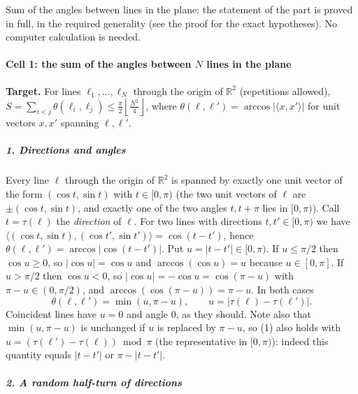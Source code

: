 
Sum of the angles between lines in the plane: the statement of the part
is proved in full, in the required generality (see the proof for the
exact hypotheses). No computer calculation is needed.


\paragraph{\texorpdfstring{Cell 1: the sum of the angles between \(N\)
lines in the
plane}{Cell 1: the sum of the angles between N lines in the plane}}\label{cell-1-the-sum-of-the-angles-between-n-lines-in-the-plane}

\textbf{Target.} For lines \(\ell_1,\dots,\ell_N\) through the origin of
\(\mathbb R^2\) (repetitions allowed),
\(S=\sum_{i<j}\theta(\ell_i,\ell_j)\le \frac{\pi}{2}\left\lfloor \frac{N^2}{4}\right\rfloor\),
where \(\theta(\ell,\ell')=\arccos|\langle x,x'\rangle|\) for unit
vectors \(x,x'\) spanning \(\ell,\ell'\).

\subparagraph{1. Directions and angles}\label{directions-and-angles}

Every line \(\ell\) through the origin of \(\mathbb R^2\) is spanned by
exactly one unit vector of the form \((\cos t,\sin t)\) with
\(t\in[0,\pi)\) (the two unit vectors of \(\ell\) are
\(\pm(\cos t,\sin t)\), and exactly one of the two angles \(t,t+\pi\)
lies in \([0,\pi)\)). Call \(t=\tau(\ell)\) the \emph{direction} of
\(\ell\). For two lines with directions \(t,t'\in[0,\pi)\) we have
\(\langle(\cos t,\sin t),(\cos t',\sin t')\rangle=\cos(t-t')\), hence
\(\theta(\ell,\ell')=\arccos|\cos(t-t')|\). Put \(u=|t-t'|\in[0,\pi)\).
If \(u\le\pi/2\) then \(\cos u\ge 0\), so \(|\cos u|=\cos u\) and
\(\arccos(\cos u)=u\) because \(u\in[0,\pi]\). If \(u>\pi/2\) then
\(\cos u<0\), so \(|\cos u|=-\cos u=\cos(\pi-u)\) with
\(\pi-u\in(0,\pi/2)\), and \(\arccos(\cos(\pi-u))=\pi-u\). In both cases
\[\theta(\ell,\ell')=\min(u,\pi-u),\qquad u=|\tau(\ell)-\tau(\ell')|.\tag{1}\]
Coincident lines have \(u=0\) and angle \(0\), as they should. Note also
that \(\min(u,\pi-u)\) is unchanged if \(u\) is replaced by \(\pi-u\),
so (1) also holds with \(u=(\tau(\ell')-\tau(\ell))\bmod\pi\) (the
representative in \([0,\pi)\)): indeed this quantity equals \(|t-t'|\)
or \(\pi-|t-t'|\).

\subparagraph{2. A random half-turn of
directions}\label{a-random-half-turn-of-directions}

